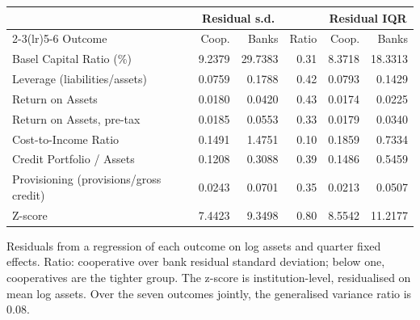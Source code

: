 \small
\setlength{\tabcolsep}{5pt}
\begin{tabular}{lrrrrr}
\toprule
 & \multicolumn{2}{c}{Residual s.d.} & & \multicolumn{2}{c}{Residual IQR} \\
\cmidrule(lr){2-3}\cmidrule(lr){5-6}
Outcome & Coop. & Banks & Ratio & Coop. & Banks \\
\midrule
Basel Capital Ratio (\%) & 9.2379 & 29.7383 & 0.31 & 8.3718 & 18.3313 \\
Leverage (liabilities/assets) & 0.0759 & 0.1788 & 0.42 & 0.0793 & 0.1429 \\
Return on Assets & 0.0180 & 0.0420 & 0.43 & 0.0174 & 0.0225 \\
Return on Assets, pre-tax & 0.0185 & 0.0553 & 0.33 & 0.0179 & 0.0340 \\
Cost-to-Income Ratio & 0.1491 & 1.4751 & 0.10 & 0.1859 & 0.7334 \\
Credit Portfolio / Assets & 0.1208 & 0.3088 & 0.39 & 0.1486 & 0.5459 \\
Provisioning (provisions/gross credit) & 0.0243 & 0.0701 & 0.35 & 0.0213 & 0.0507 \\
Z-score & 7.4423 & 9.3498 & 0.80 & 8.5542 & 11.2177 \\
\bottomrule
\end{tabular}
\begin{tablenotes}[flushleft]\footnotesize
\item Residuals from a regression of each outcome on log assets and quarter fixed effects. Ratio: cooperative over bank residual standard deviation; below one, cooperatives are the tighter group. The z-score is institution-level, residualised on mean log assets. Over the seven outcomes jointly, the generalised variance ratio is 0.08.
\end{tablenotes}
